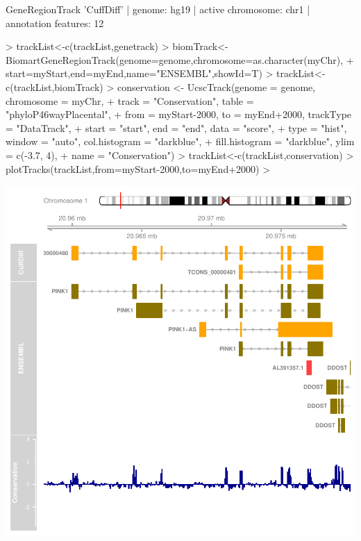 \documentclass[10pt]{article}
\begin{document}
\begin{Schunk}
\begin{Soutput}
GeneRegionTrack 'CuffDiff'
| genome: hg19
| active chromosome: chr1
| annotation features: 12
\end{Soutput}
\begin{Sinput}
> trackList<-c(trackList,genetrack)
> biomTrack<-BiomartGeneRegionTrack(genome=genome,chromosome=as.character(myChr),
+ 		start=myStart,end=myEnd,name="ENSEMBL",showId=T)
> trackList<-c(trackList,biomTrack)
> conservation <- UcscTrack(genome = genome, chromosome = myChr,
+ 		track = "Conservation", table = "phyloP46wayPlacental",
+ 		from = myStart-2000, to = myEnd+2000, trackType = "DataTrack",
+ 		start = "start", end = "end", data = "score",
+ 		type = "hist", window = "auto", col.histogram = "darkblue",
+ 		fill.histogram = "darkblue", ylim = c(-3.7, 4),
+ 		name = "Conservation")
> trackList<-c(trackList,conservation)
> plotTracks(trackList,from=myStart-2000,to=myEnd+2000)
> 
\end{Sinput}
\end{Schunk}
\includegraphics{graphics/cummeRbund-manual-features_3}
\end{document}
